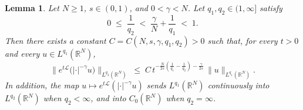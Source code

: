 \documentclass[12pt,reqno]{amsart}
\theoremstyle{plain}
\newtheorem{lem}[thm]{Lemma}
\theoremstyle{definition}
\theoremstyle{remark}
\numberwithin{equation}{section}
\begin{document}
\begin{lem}\label{lem:weighted-smoothing}
Let $N\geq 1$, $s\in(0,1)$, and $0<\gamma<N$. Let $q_{1},q_{2}\in(1,\infty]$ satisfy
\begin{equation}\label{eq:wcond}
0\;\leq\;\frac{1}{q_{2}}\;<\;\frac{\gamma}{N}+\frac{1}{q_{1}}\;<\;1.
\end{equation}
Then there exists a constant $C=C(N,s,\gamma,q_{1},q_{2})>0$ such that, for every $t>0$ and every $u\in L^{q_{1}}(\mathbb{R}^{N})$,
\begin{equation}\label{eq:weighted-smoothing}
\bigl\|e^{t\mathscr{L}}\bigl(|\cdot|^{-\gamma}u\bigr)\bigr\|_{L^{q_{2}}(\mathbb{R}^{N})}
\;\leq\;C\,t^{-\frac{N}{2s}\left(\frac{1}{q_{1}}-\frac{1}{q_{2}}\right)-\frac{\gamma}{2s}}\,
\|u\|_{L^{q_{1}}(\mathbb{R}^{N})}.
\end{equation}
In addition, the map $u\mapsto e^{t\mathscr{L}}(|\cdot|^{-\gamma}u)$ sends $L^{q_{1}}(\mathbb{R}^{N})$ continuously into $L^{q_{2}}(\mathbb{R}^{N})$ when $q_{2}<\infty$, and into $C_{0}(\mathbb{R}^{N})$ when $q_{2}=\infty$.
\end{lem}
\end{document}
